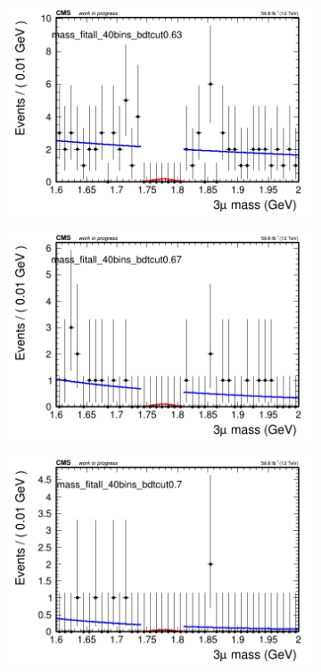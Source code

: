 \begin{figure}[H]
\begin{subfigure}{0.2\textwidth}
        \caption{}
    \end{subfigure}
    \begin{subfigure}{0.2\textwidth}
        \includegraphics[width=\textwidth]{power_law/plots/all/massfit_all_40bins_bdtcut0.63.png}
        \caption{}
    \end{subfigure}
    \begin{subfigure}{0.2\textwidth}
        \includegraphics[width=\textwidth]{power_law/plots/all/massfit_all_40bins_bdtcut0.67.png}
        \caption{}
    \end{subfigure}
    \begin{subfigure}{0.2\textwidth}
        \includegraphics[width=\textwidth]{power_law/plots/all/massfit_all_40bins_bdtcut0.7.png}

\end{subfigure}
\end{figure}
